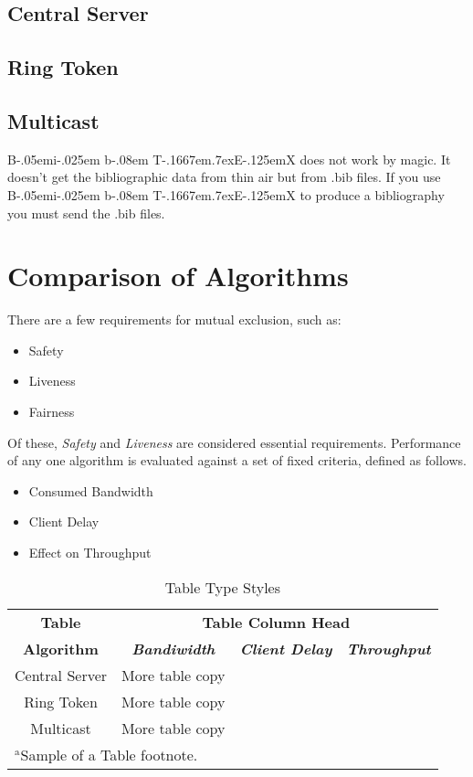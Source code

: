 \documentclass[conference]{IEEEtran}
\def\BibTeX{{\rm B\kern-.05em{\sc i\kern-.025em b}\kern-.08em
    T\kern-.1667em\lower.7ex\hbox{E}\kern-.125emX}}
\begin{document}
\subsection{Central Server}
\subsection{Ring Token}
\subsection{Multicast}

{\BibTeX} does not work by magic. It doesn't get the bibliographic
data from thin air but from .bib files. If you use {\BibTeX} to produce a
bibliography you must send the .bib files. 


\section{Comparison of Algorithms}
There are a few requirements for mutual exclusion, such as:
\begin{itemize}
  \item Safety
  \item Liveness
  \item Fairness
\end{itemize}
Of these, \textit{Safety} and \textit{Liveness} are considered essential
requirements.
Performance of any one algorithm is evaluated against a set of fixed criteria,
defined as follows.
\begin{itemize}
  \item Consumed Bandwidth
  \item Client Delay
  \item Effect on Throughput
\end{itemize}

\begin{table}[htbp]
\caption{Table Type Styles}
\begin{center}
\begin{tabular}{|c|c|c|c|}
\hline
\textbf{Table}&\multicolumn{3}{|c|}{\textbf{Table Column Head}} \\
\cline{2-4} 
\textbf{Algorithm} & \textbf{\textit{Bandiwidth}}& \textbf{\textit{Client
  Delay}}& \textbf{\textit{Throughput}} \\
\hline
Central Server & More table copy & &  \\
Ring Token & More table copy & &  \\
Multicast & More table copy & &  \\
\hline
\multicolumn{4}{l}{$^{\mathrm{a}}$Sample of a Table footnote.}
\end{tabular}
\label{tab1}
\end{center}
\end{table}
\end{document}
